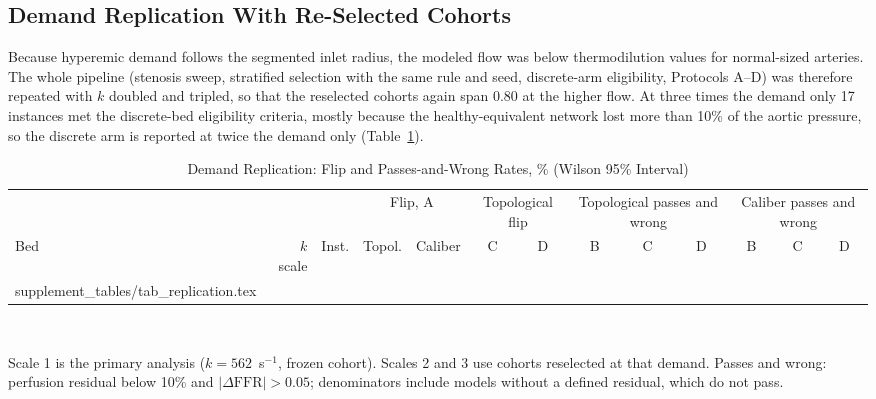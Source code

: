 \documentclass[journal,onecolumn,11pt]{IEEEtran}
\begin{document}
\subsection{Demand Replication With Re-Selected Cohorts}\label{sec:replication}
Because hyperemic demand follows the segmented inlet radius, the modeled flow was below thermodilution values for
normal-sized arteries. The whole pipeline (stenosis sweep, stratified selection with the same rule and seed,
discrete-arm eligibility, Protocols A--D) was therefore repeated with $k$ doubled and tripled, so that the reselected
cohorts again span 0.80 at the higher flow. At three times the demand only 17 instances met the discrete-bed
eligibility criteria, mostly because the healthy-equivalent network lost more than 10\% of the aortic pressure, so the
discrete arm is reported at twice the demand only (Table~\ref{tab:repl}).
\begin{table}[!ht]
\caption{Demand Replication: Flip and Passes-and-Wrong Rates, \% (Wilson 95\% Interval)}\label{tab:repl}
\centering\footnotesize\setlength{\tabcolsep}{3pt}
\begin{tabular}{@{}lrrcccccccccc@{}}
\toprule
 & & & \multicolumn{2}{c}{Flip, A} & \multicolumn{2}{c}{Topological flip} & \multicolumn{3}{c}{Topological passes and wrong} & \multicolumn{3}{c}{Caliber passes and wrong}\\
\cmidrule(lr){4-5}\cmidrule(lr){6-7}\cmidrule(lr){8-10}\cmidrule(l){11-13}
Bed & $k$ scale & Inst. & Topol. & Caliber & C & D & B & C & D & B & C & D\\
\midrule
{} supplement_tables/tab_replication.tex 
\bottomrule
\end{tabular}
\\[3pt]
\parbox{0.95\textwidth}{\footnotesize Scale 1 is the primary analysis ($k = 562$~s$^{-1}$, frozen cohort). Scales 2 and 3 use
cohorts reselected at that demand. Passes and wrong: perfusion residual below 10\% and $|\Delta\mathrm{FFR}| > 0.05$;
denominators include models without a defined residual, which do not pass.}
\end{table}

\FloatBarrier
\end{document}
